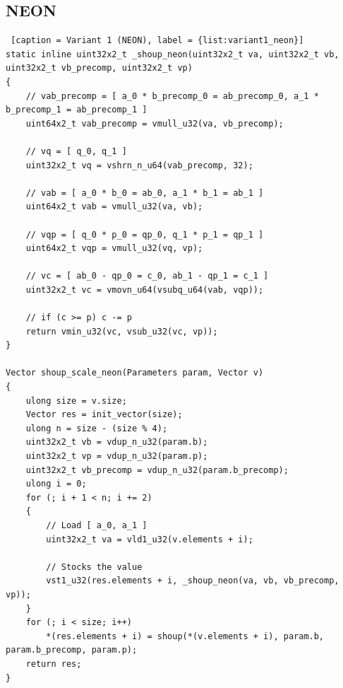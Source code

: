 \documentclass{article}
\begin{document}
\subsection{NEON}
\begin{lstlisting} [caption = Variant 1 (NEON), label = {list:variant1_neon}]
static inline uint32x2_t _shoup_neon(uint32x2_t va, uint32x2_t vb, uint32x2_t vb_precomp, uint32x2_t vp)
{
    // vab_precomp = [ a_0 * b_precomp_0 = ab_precomp_0, a_1 * b_precomp_1 = ab_precomp_1 ]
    uint64x2_t vab_precomp = vmull_u32(va, vb_precomp);

    // vq = [ q_0, q_1 ]
    uint32x2_t vq = vshrn_n_u64(vab_precomp, 32);

    // vab = [ a_0 * b_0 = ab_0, a_1 * b_1 = ab_1 ]
    uint64x2_t vab = vmull_u32(va, vb);

    // vqp = [ q_0 * p_0 = qp_0, q_1 * p_1 = qp_1 ]
    uint64x2_t vqp = vmull_u32(vq, vp);

    // vc = [ ab_0 - qp_0 = c_0, ab_1 - qp_1 = c_1 ]
    uint32x2_t vc = vmovn_u64(vsubq_u64(vab, vqp));

    // if (c >= p) c -= p
    return vmin_u32(vc, vsub_u32(vc, vp));
}

Vector shoup_scale_neon(Parameters param, Vector v)
{
    ulong size = v.size;
    Vector res = init_vector(size);
    ulong n = size - (size % 4);
    uint32x2_t vb = vdup_n_u32(param.b);
    uint32x2_t vp = vdup_n_u32(param.p);
    uint32x2_t vb_precomp = vdup_n_u32(param.b_precomp);
    ulong i = 0;
    for (; i + 1 < n; i += 2)
    {
        // Load [ a_0, a_1 ]
        uint32x2_t va = vld1_u32(v.elements + i);

        // Stocks the value
        vst1_u32(res.elements + i, _shoup_neon(va, vb, vb_precomp, vp));
    }
    for (; i < size; i++)
        *(res.elements + i) = shoup(*(v.elements + i), param.b, param.b_precomp, param.p);
    return res;
}
\end{lstlisting}
\end{document}
